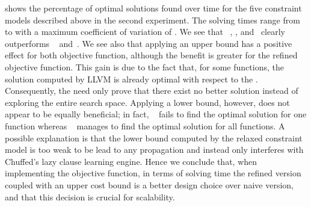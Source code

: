  shows the
percentage of optimal \glspl{solution} found over time for the five
\glspl{constraint model} described above in the second experiment.
%
The solving times range from
\printMinSolvingTime{
  \ObjFunRefinedVsNaiveOptProofsOverTimeNaiveNoBoundsSolvingTimeAvgMin,
  \ObjFunRefinedVsNaiveOptProofsOverTimeNaiveWUbSolvingTimeAvgMin,
  \ObjFunRefinedVsNaiveOptProofsOverTimeRefinedNoBoundsSolvingTimeAvgMin,
  \ObjFunRefinedVsNaiveOptProofsOverTimeRefinedWUbSolvingTimeAvgMin,
  \ObjFunRefinedVsNaiveOptProofsOverTimeRefinedWLbUbSolvingTimeAvgMin
} to
\printMaxSolvingTime{
  \ObjFunRefinedVsNaiveOptProofsOverTimeNaiveNoBoundsSolvingTimeAvgMax,
  \ObjFunRefinedVsNaiveOptProofsOverTimeNaiveWUbSolvingTimeAvgMax,
  \ObjFunRefinedVsNaiveOptProofsOverTimeRefinedNoBoundsSolvingTimeAvgMax,
  \ObjFunRefinedVsNaiveOptProofsOverTimeRefinedWUbSolvingTimeAvgMax,
  \ObjFunRefinedVsNaiveOptProofsOverTimeRefinedWLbUbSolvingTimeAvgMax
} with a maximum coefficient of variation of
\numMaxOf{
  \ObjFunRefinedVsNaiveOptProofsOverTimeNaiveNoBoundsSolvingTimeCvMax,
  \ObjFunRefinedVsNaiveOptProofsOverTimeNaiveWUbSolvingTimeCvMax,
  \ObjFunRefinedVsNaiveOptProofsOverTimeRefinedNoBoundsSolvingTimeCvMax,
  \ObjFunRefinedVsNaiveOptProofsOverTimeRefinedWUbSolvingTimeCvMax,
  \ObjFunRefinedVsNaiveOptProofsOverTimeRefinedWLbUbSolvingTimeCvMax
}.
%
We see that ~\modelE, \modelF, and~\modelG{}
clearly outperforms ~\modelC{} and~\modelD.
%
We see also that applying an upper bound has a positive effect for both
\gls{objective function}, although the benefit is greater for the refined
\gls{objective function}.
%
This gain is due to the fact that, for some \glspl{function}, the \gls{solution}
computed by \gls{LLVM} is already optimal with respect to the
.
%
Consequently, the  need only prove that there exist
no better \gls{solution} instead of exploring the entire \gls{search space}.
%
Applying a lower bound, however, does not appear to be equally beneficial; in
fact, ~\modelG{} fails to find the optimal
\gls{solution} for one \gls{function} whereas ~\modelF{} manages to find the optimal \gls{solution} for all
\glspl{function}.
%
A possible explanation is that the lower bound computed by the relaxed
\gls{constraint model} is too weak to be lead to any \gls{propagation} and
instead only interferes with \gls{Chuffed}'s \gls{lazy clause learning} engine.
%
Hence we conclude that, when implementing the \gls{objective function}, in terms
of solving time the refined version coupled with an upper cost bound is a better
design choice over naive version, and that this decision is crucial for
scalability.

